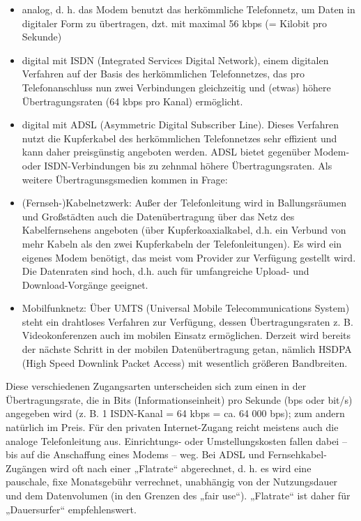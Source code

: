 \documentclass[]{book}
\providecommand{\tightlist}{%
  \setlength{\itemsep}{0pt}\setlength{\parskip}{0pt}}
\theoremstyle{definition}
\theoremstyle{definition}
\theoremstyle{definition}
\theoremstyle{remark}
\begin{document}
\begin{itemize}
\tightlist
\item
  analog, d. h. das Modem benutzt das herkömmliche Telefonnetz, um Daten
  in digitaler Form zu übertragen, dzt. mit maximal 56 kbps (= Kilobit
  pro Sekunde)
\item
  digital mit ISDN (Integrated Services Digital Network), einem
  digitalen Verfahren auf der Basis des herkömmlichen Telefonnetzes, das
  pro Telefonanschluss nun zwei Verbindungen gleichzeitig und (etwas)
  höhere Übertragungsraten (64 kbps pro Kanal) ermöglicht.
\item
  digital mit ADSL (Asymmetric Digital Subscriber Line). Dieses
  Verfahren nutzt die Kupferkabel des herkömmlichen Telefonnetzes sehr
  effizient und kann daher preisgünstig angeboten werden. ADSL bietet
  gegenüber Modem- oder ISDN-Verbindungen bis zu zehnmal höhere
  Übertragungsraten. Als weitere Übertragunsgsmedien kommen in Frage:
\item
  (Fernseh-)Kabelnetzwerk: Außer der Telefonleitung wird in
  Ballungsräumen und Großstädten auch die Datenübertragung über das Netz
  des Kabelfernsehens angeboten (über Kupferkoaxialkabel, d.h. ein
  Verbund von mehr Kabeln als den zwei Kupferkabeln der
  Telefonleitungen). Es wird ein eigenes Modem benötigt, das meist vom
  Provider zur Verfügung gestellt wird. Die Datenraten sind hoch, d.h.
  auch für umfangreiche Upload- und Download-Vorgänge geeignet.
\item
  Mobilfunknetz: Über UMTS (Universal Mobile Telecommunications System)
  steht ein drahtloses Verfahren zur Verfügung, dessen Übertragungsraten
  z. B. Videokonferenzen auch im mobilen Einsatz ermöglichen. Derzeit
  wird bereits der nächste Schritt in der mobilen Datenübertragung
  getan, nämlich HSDPA (High Speed Downlink Packet Access) mit
  wesentlich größeren Bandbreiten.
\end{itemize}

Diese verschiedenen Zugangsarten unterscheiden sich zum einen in der
Übertragungsrate, die in Bits (Informationseinheit) pro Sekunde (bps
oder bit/s) angegeben wird (z. B. 1 ISDN-Kanal = 64 kbps = ca. 64 000
bps); zum andern natürlich im Preis. Für den privaten Internet-Zugang
reicht meistens auch die analoge Telefonleitung aus. Einrichtungs- oder
Umstellungskosten fallen dabei -- bis auf die Anschaffung eines Modems
-- weg. Bei ADSL und Fernsehkabel-Zugängen wird oft nach einer
„Flatrate`` abgerechnet, d. h. es wird eine pauschale, fixe Monatsgebühr
verrechnet, unabhängig von der Nutzungsdauer und dem Datenvolumen (in
den Grenzen des „fair use``). „Flatrate`` ist daher für „Dauersurfer``
empfehlenswert.
\end{document}
